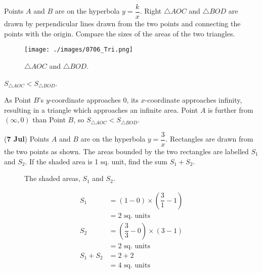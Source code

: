 \documentclass[12pt,answers]{exam}
\renewcommand{\frac}[2]{\dfrac{#1}{#2}}
\newcommand{\qndate}[2]{(\textbf{#1 #2})}
\begin{document}
\begin{questions}
	\question Points $A$ and $B$ are on the hyperbola $y = \frac{k}{x}$. Right $\triangle AOC$
	and $\triangle BOD$ are drawn by perpendicular lines drawn from the two points and connecting
	the points with the origin. Compare the sizes of the areas of the two triangles.
	\begin{figure}[htpb]
		\centering
		\texttt{[image: ./images/0706\_Tri.png]}
		\caption{$\triangle AOC$ and $\triangle BOD$.}
		\label{fig:0706_Tri}
	\end{figure}
	\begin{solution}
		$S_{\triangle AOC} < S_{\triangle BOD}$.

		As Point $B$'s $y$-coordinate approaches 0, its $x$-coordinate approaches infinity,
		resulting in a triangle which approaches an infinite area. Point $A$ is further from
		$(\infty, 0)$ than Point $B$, so $S_{\triangle AOC} < S_{\triangle BOD}$.
	\end{solution}

	\question \qndate{7}{Jul} Points $A$ and $B$ are on the hyperbola $y = \frac{3}{x}$.
	Rectangles are drawn from the two points as shown. The areas bounded by the two
	rectangles are labelled $S_1$ and $S_2$. If the shaded area is 1 sq. unit, find
	the sum $S_1 + S_2$.
	\begin{figure}[htpb]
		\centering
		\caption{The shaded areas, $S_1$ and $S_2$.}
		\label{fig:0707_Hyper}
	\end{figure}
	\begin{solution}
		\begin{align*}
			S_1       & = \left(1 - 0\right) \times \left(\frac{3}{1}-1\right)   \\
			          & = 2 \text{ sq. units}                                    \\
			S_2       & = \left(\frac{3}{3} - 0\right) \times \left(3 - 1\right) \\
			          & = 2 \text{ sq. units}                                    \\
			S_1 + S_2 & = 2 + 2                                                  \\
			          & = 4 \text{ sq. units}
		\end{align*}
	\end{solution}
\end{questions}
\end{document}
